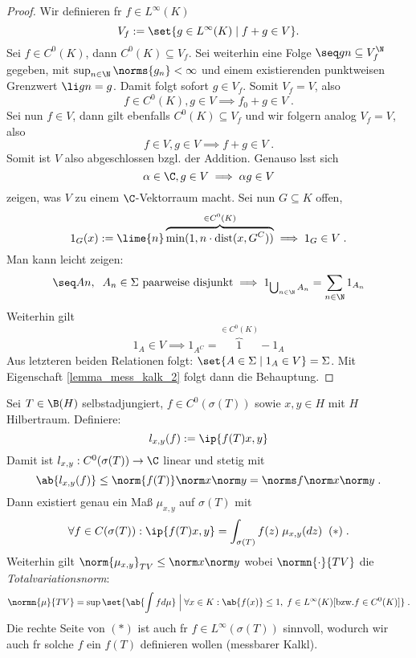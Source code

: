 \begin{proof}
	Wir definieren f\us r \(f\in L^\infty(K)\)
	\[V_f := \set{g\in L^\infty(K)\;\vert\; f+g \in V}.\]
	Sei \(f\in C^0(K)\), dann \(C^0(K)\subseteq V_f\). Sei weiterhin eine Folge \(\seq gn \subseteq V_f^\N\) gegeben, mit \(\sup_{n\in\N} \norms{g_n} < \infty\) und einem existierenden punktweisen Grenzwert \(\li gn = g\). Damit folgt sofort \(g\in V_f\). Somit \(V_f = V\), also 
	\[f \in C^0(K), g\in V \implies f_0 + g \in V\;.\]
	Sei nun \(f\in V\), dann gilt ebenfalls \(C^0(K) \subseteq V_f\) und wir folgern analog \(V_f = V\), also 
	\[f\in V, g\in V \implies f + g \in V\;.\] 
	Somit ist $V$ also abgeschlossen bzgl. der Addition. Genauso l\as sst sich \[\alpha \in \C, g\in V \implies \alpha g \in V\] zeigen, was $V$ zu einem \(\C\)-Vektorraum macht.
	Sei nun \(G\subseteq K\) offen, 
	\[1_G(x) := \lime{n} \overbrace{\min(1,n\cdot \text{dist}(x, G^C))}^{\in C^0(K)} \implies 1_G \in V\;.\]
	Man kann leicht zeigen:
	\[\seq An,\;\; A_n \in \Sigma \text{ paarweise disjunkt} \implies 1_{\bigcup_{n\in\N} A_n} = \sum_{n\in\N} 1_{A_n}\]
	Weiterhin gilt
	\[1_A\in V \implies 1_{A^C} = \overbrace{1}^{\in C^0(K)}-1_A\]
	Aus letzteren beiden Relationen folgt: \(\set{A\in \Sigma \;\vert\; 1_A\in V} = \Sigma\). Mit Eigenschaft \ref{lemma_mess_kalk_2} folgt dann die Behauptung.
\end{proof}

\begin{rem}
	Sei \(T\in \B(H)\) selbstadjungiert, \(f\in C^0(\sigma(T))\) sowie \(x,y \in H\) mit $H$ Hilbertraum. Definiere:
	\[l_{x,y}(f):= \ip{f(T)x,y}\]
	Damit ist \(l_{x,y}:C^0(\sigma(T)) \to \C\) linear und stetig mit
	\[\ab{l_{x,y}(f)} \leq \norm{f(T)} \norm x\norm y = \norms f \norm x \norm y\;.\]
	Dann existiert genau ein Ma\ss{} $\mu_{x,y}$ auf \(\sigma(T)\) mit 
	\[\forall f \in C(\sigma(T)): \ip{f(T)x,y} = \int_{\sigma(T)} f(z) \;\mu_{x,y}(dz)\;\;(*)\;.\]
	Weiterhin gilt \(\norm{\mu_{x,y}}_{TV} \leq \norm x\norm y\) wobei $\normn{\cdot}{TV}$ die \textit{Totalvariationsnorm}:
	\[\normn{\mu}{TV} = \sup\set{\ab{\int fd\mu}\;\Big\vert\; \forall x \in K: \ab{f(x)} \leq 1, \;f \in L^\infty(K)[\text{bzw.} f\in C^0(K)]}\;.\]
	Die rechte Seite von $(*)$ ist auch f\us r $f\in L^\infty(\sigma(T))$ sinnvoll, wodurch wir auch f\us r solche $f$ ein $f(T)$ definieren wollen (messbarer Kalk\us l).
	\label{rem_mess_kalk}
\end{rem}

